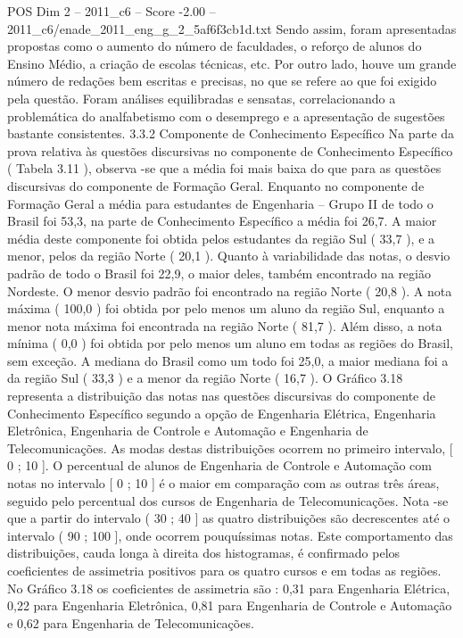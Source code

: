 \begin{textsample}{POS Dim 2 – 2011\_c6 – Score -2.00 – 2011\_c6/enade\_2011\_eng\_g\_2\_5af6f3cb1d.txt}
Sendo assim, foram apresentadas propostas como o aumento do número de faculdades, o reforço de alunos do Ensino Médio, a criação de escolas técnicas, etc.
Por outro lado, houve um grande número de redações bem escritas e precisas, no que se refere ao que foi exigido pela questão.
Foram análises equilibradas e sensatas, correlacionando a problemática do analfabetismo com o desemprego e a apresentação de sugestões bastante consistentes. 3.3.2 Componente de Conhecimento Específico Na parte da prova relativa às questões discursivas no componente de Conhecimento Específico ( Tabela 3.11 ), observa -se que a média foi mais baixa do que para as questões discursivas do componente de Formação Geral.
Enquanto no componente de Formação Geral a média para estudantes de Engenharia – Grupo II de todo o Brasil foi 53,3, na parte de Conhecimento Específico a média foi 26,7.
A maior média deste componente foi obtida pelos estudantes da região Sul ( 33,7 ), e a menor, pelos da região Norte ( 20,1 ).
Quanto à variabilidade das notas, o desvio padrão de todo o Brasil foi 22,9, o maior deles, também encontrado na região Nordeste.
O menor desvio padrão foi encontrado na região Norte ( 20,8 ).
A nota máxima ( 100,0 ) foi obtida por pelo menos um aluno da região Sul, enquanto a menor nota máxima foi encontrada na região Norte ( 81,7 ).
Além disso, a nota mínima ( 0,0 ) foi obtida por pelo menos um aluno em todas as regiões do Brasil, sem exceção.
A mediana do Brasil como um todo foi 25,0, a maior mediana foi a da região Sul ( 33,3 ) e a menor da região Norte ( 16,7 ).
O Gráfico 3.18 representa a distribuição das notas nas questões discursivas do componente de Conhecimento Específico segundo a opção de Engenharia Elétrica, Engenharia Eletrônica, Engenharia de Controle e Automação e Engenharia de Telecomunicações.
As modas destas distribuições ocorrem no primeiro intervalo, [ 0 ; 10 ].
O percentual de alunos de Engenharia de Controle e Automação com notas no intervalo [ 0 ; 10 ] é o maior em comparação com as outras três áreas, seguido pelo percentual dos cursos de Engenharia de Telecomunicações.
Nota -se que a partir do intervalo ( 30 ; 40 ] as quatro distribuições são decrescentes até o intervalo ( 90 ; 100 ], onde ocorrem pouquíssimas notas.
Este comportamento das distribuições, cauda longa à direita dos histogramas, é confirmado pelos coeficientes de assimetria positivos para os quatro cursos e em todas as regiões.
No Gráfico 3.18 os coeficientes de assimetria são : 0,31 para Engenharia Elétrica, 0,22 para Engenharia Eletrônica, 0,81 para Engenharia de Controle e Automação e 0,62 para Engenharia de Telecomunicações.

\end{textsample}
